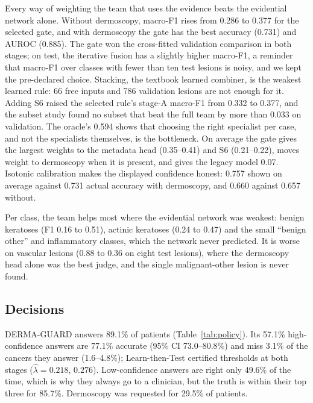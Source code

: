 \documentclass[conference]{IEEEtran}
\begin{document}
Every way of weighting the team that uses the evidence beats the evidential network alone. Without dermoscopy, macro-F1 rises from 0.286 to 0.377 for the selected gate, and with dermoscopy the gate has the best accuracy (0.731) and AUROC (0.885). The gate won the cross-fitted validation comparison in both stages; on test, the iterative fusion has a slightly higher macro-F1, a reminder that macro-F1 over classes with fewer than ten test lesions is noisy, and we kept the pre-declared choice. Stacking, the textbook learned combiner, is the weakest learned rule: 66 free inputs and 786 validation lesions are not enough for it. Adding S6 raised the selected rule's stage-A macro-F1 from 0.332 to 0.377, and the subset study found no subset that beat the full team by more than 0.033 on validation. The oracle's 0.594 shows that choosing the right specialist per case, and not the specialists themselves, is the bottleneck. On average the gate gives the largest weights to the metadata head (0.35--0.41) and S6 (0.21--0.22), moves weight to dermoscopy when it is present, and gives the legacy model 0.07. Isotonic calibration makes the displayed confidence honest: 0.757 shown on average against 0.731 actual accuracy with dermoscopy, and 0.660 against 0.657 without.

Per class, the team helps most where the evidential network was weakest: benign keratoses (F1 0.16 to 0.51), actinic keratoses (0.24 to 0.47) and the small ``benign other'' and inflammatory classes, which the network never predicted. It is worse on vascular lesions (0.88 to 0.36 on eight test lesions), where the dermoscopy head alone was the best judge, and the single malignant-other lesion is never found.

\subsection{Decisions}
DERMA-GUARD answers 89.1\% of patients (Table~\ref{tab:policy}). Its 57.1\% high-confidence answers are 77.1\% accurate (95\% CI 73.0--80.8\%) and miss 3.1\% of the cancers they answer (1.6--4.8\%); Learn-then-Test certified thresholds at both stages ($\hat\lambda=0.218,\,0.276$). Low-confidence answers are right only 49.6\% of the time, which is why they always go to a clinician, but the truth is within their top three for 85.7\%. Dermoscopy was requested for 29.5\% of patients.
\end{document}
